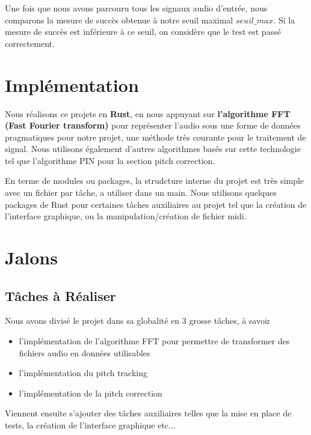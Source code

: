 \documentclass{article}
\begin{document}
Une fois que nous avons parcouru tous les signaux audio d'entrée, nous comparons la mesure de succès obtenue à notre seuil maximal \( \textit{seuil\_max} \). Si la mesure de succès est inférieure à ce seuil, on considère que le test est passé correctement.


\par





\section{Implémentation}

Nous réalisons ce projets en \textbf{Rust}, en nous appuyant sur \textbf{l'algorithme FFT (Fast Fourier transform)} pour représenter l'audio sous une forme de données pragmatiques pour notre projet, une méthode très courante pour le traitement de signal. 
Nous utilisons également d'autres algorithmes basés sur cette technologie tel que l'algorithme PIN pour la section pitch correction.
\par
En terme de modules ou packages, la strudcture interne du projet est très simple avec un fichier par tâche, a utiliser dans un main.
Nous utilisons quelques packages de Rust pour certaines tâches auxiliaires au projet tel que la création de l'interface graphique, ou la manipulation/création de fichier midi.


\section{Jalons}

\subsection{Tâches à Réaliser}

Nous avons divisé le projet dans sa globalité en 3 grosse tâches, à savoir 
\begin{itemize}
  \item l'implémentation de l'algorithme FFT pour permettre de transformer des fichiers audio en données utilisables
  \item l'implémentation du pitch tracking
  \item l'implémentation de la pitch correction
\end{itemize}

Viennent ensuite s'ajouter des tâches auxiliaires telles que la mise en place de tests, la création de l'interface graphique etc...
\end{document}
